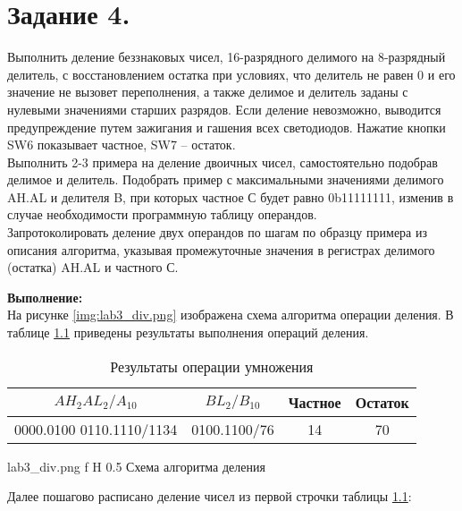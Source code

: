 \documentclass{bmstu}
\begin{document}
\newpage
\chapter{Задание 4.}
Выполнить деление беззнаковых чисел, 16-разрядного делимого на 8-разрядный делитель, с восстановлением остатка при 
условиях, что делитель не равен 0 и его значение не вызовет переполнения, а также делимое и делитель заданы с 
нулевыми значениями старших разрядов. Если деление невозможно, выводится предупреждение путем зажигания и гашения 
всех светодиодов. Нажатие кнопки SW6 показывает частное, SW7 – остаток. \\ 
Выполнить 2-3 примера на деление двоичных чисел, самостоятельно подобрав делимое и делитель. Подобрать пример с 
максимальными значениями делимого AH.AL и делителя B, при которых частное С будет равно 0b11111111, изменив в 
случае необходимости программную таблицу операндов. \\
Запротоколировать деление двух операндов по шагам по образцу примера из описания алгоритма, указывая промежуточные 
значения в регистрах делимого (остатка) AH.AL и частного С.

\textbf{Выполнение:} \\
На рисунке \ref{img:lab3_div.png} изображена схема алгоритма операции деления.
В таблице \ref{table:div_table} приведены результаты выполнения операций деления.

\begin{table}[h]
\caption{Результаты операции умножения}
	\label{table:div_table}
	\begin{tabular}{|c|c|c|c|}
	\hline
		$AH_2 AL_2 / A_{10}$ & $BL_2 / B_{10}$ & Частное & Остаток\\
	\hline
	 	0000.0100 0110.1110/1134 & 0100.1100/76 & 14 & 70

	\end{tabular}
\end{table}

	{lab3_div.png}
	{f}
	{H}
	{0.5\textwidth}
	{Схема алгоритма деления}
	
Далее пошагово расписано деление чисел из первой строчки таблицы \ref{table:div_table}:
\end{document}
